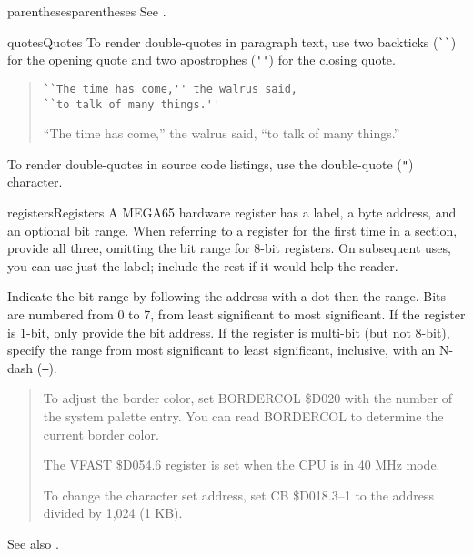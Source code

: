 \begin{sgentry}{parentheses}{parentheses}
    See .
\end{sgentry}

\begin{sgentry}{quotes}{Quotes}
    To render double-quotes in paragraph text, use two backticks (\verb|``|) for the opening quote and two apostrophes (\verb|''|) for the closing quote.

    \begin{quote}
        \begin{verbatim}
``The time has come,'' the walrus said,
``to talk of many things.''
        \end{verbatim}

        \hrulefill

        ``The time has come,'' the walrus said, ``to talk of many things.''
    \end{quote}

    To render double-quotes in source code listings, use the double-quote (\verb|"|) character.
\end{sgentry}

\begin{sgentry}{registers}{Registers}
    A MEGA65 hardware register has a label, a byte address, and an optional bit range. When referring to a register for the first time in a section, provide all three, omitting the bit range for 8-bit registers. On subsequent uses, you can use just the label; include the rest if it would help the reader.

    Indicate the bit range by following the address with a dot then the range. Bits are numbered from 0 to 7, from least significant to most significant. If the register is 1-bit, only provide the bit address. If the register is multi-bit (but not 8-bit), specify the range from most significant to least significant, inclusive, with an N-dash (\texttt{--}).

    \begin{quote}
        To adjust the border color, set BORDERCOL \$D020 with the number of the system palette entry. You can read BORDERCOL to determine the current border color.

        The VFAST \$D054.6 register is set when the CPU is in 40 MHz mode.

        To change the character set address, set CB \$D018.3--1 to the address divided by 1,024 (1 KB).
    \end{quote}

    See also .
\end{sgentry}

